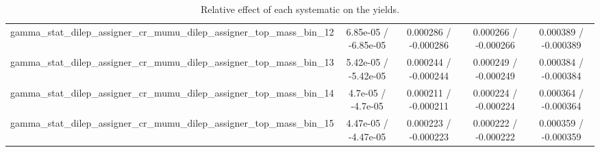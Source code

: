 \documentclass[10pt]{article}
\begin{document}
\begin{table}[htbp]
\begin{center}
\begin{tabular}{|c|c|c|c|c|}
  gamma_stat_dilep_assigner_cr_mumu_dilep_assigner_top_mass_bin_12 & 6.85e-05 / -6.85e-05 & 0.000286 / -0.000286 & 0.000266 / -0.000266 & 0.000389 / -0.000389 \\ 
  gamma_stat_dilep_assigner_cr_mumu_dilep_assigner_top_mass_bin_13 & 5.42e-05 / -5.42e-05 & 0.000244 / -0.000244 & 0.000249 / -0.000249 & 0.000384 / -0.000384 \\ 
  gamma_stat_dilep_assigner_cr_mumu_dilep_assigner_top_mass_bin_14 & 4.7e-05 / -4.7e-05 & 0.000211 / -0.000211 & 0.000224 / -0.000224 & 0.000364 / -0.000364 \\ 
  gamma_stat_dilep_assigner_cr_mumu_dilep_assigner_top_mass_bin_15 & 4.47e-05 / -4.47e-05 & 0.000223 / -0.000223 & 0.000222 / -0.000222 & 0.000359 / -0.000359 \\ 
\hline 
\end{tabular} 
\caption{Relative effect of each systematic on the yields.} 
\end{center} 
\end{table} 
\end{document}
